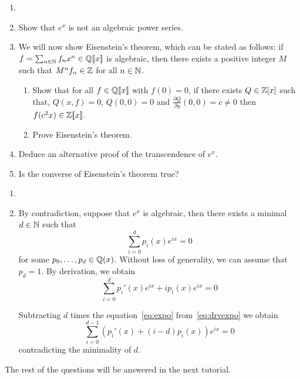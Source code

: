 \begin{exercise}
    \begin{enumerate}
        \item[]
        \item Show that $e^x$ is not an algebraic power series.
        \item We will now show Eisenstein's theorem, which can be
            stated as follows: if $f = \sum_{n \in \mathbb N} f_n x^n \in
            \mathbb Q[\![x]\!]$ is algebraic, then there exists a
            positive integer $M$ such that $M^n f_n \in \mathbb Z$ for
            all $n \in \mathbb N$.
            \begin{enumerate}
                \item Show that for all $f \in \mathbb Q[\![x]\!]$
                    with $f(0) = 0$, if there exists $Q \in
                    \mathbb Z[x]$ such that, $Q(x,f)=0$, $Q(0,0)=0$
                    and $\frac{\partial Q}{\partial y}(0,0) = c \neq
                    0$ then $f(c^2x) \in \mathbb Z[\![x]\!]$.
                \item Prove Eisenstein's theorem.
            \end{enumerate}
        \item Deduce an alternative proof of the transcendence of $e^x$.
        \item Is the converse of Eisenstein's theorem true?
    \end{enumerate}
\end{exercise}
\begin{solution}
    \begin{enumerate}
        \item[]
        \item By contradiction, suppose that $e^x$ is algebraic, then
            there exists a minimal $d \in \mathbb N$ such that
            \begin{equation}\label{eq:expo}
                \sum_{i = 0}^{d} p_i(x) e^{ix} = 0
            \end{equation}
            for some $p_0, \dots, p_d \in \mathbb Q(x)$.
            Without loss of generality, we can assume that $p_d = 1$.
            By derivation, we obtain
            \begin{equation}\label{eq:drvexpo}
                \sum_{i = 0}^{d} p_i'(x) e^{ix} + i p_i(x) e^{ix} = 0
            \end{equation}

            Subtracting $d$ times the equation~\eqref{eq:expo}
            from~\eqref{eq:drvexpo} we obtain
            \[
                \sum_{i = 0}^{d-1} (p_i'(x) + (i-d) p_i(x)) e^{ix} = 0
            \]
            contradicting the minimality of $d$.
    \end{enumerate}
    The rest of the questions will be answered in the next tutorial.
\end{solution}




